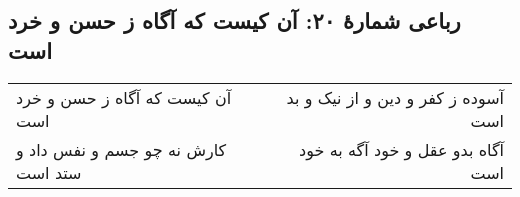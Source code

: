 \begin{center}
\section*{رباعی شمارهٔ ۲۰: آن کیست که آگاه ز حسن و خرد است}
\label{sec:020}
\begin{longtable}{l p{0.5cm} r}
آن کیست که آگاه ز حسن و خرد است
&&
آسوده ز کفر و دین و از نیک و بد است
\\
کارش نه چو جسم و نفس داد و ستد است
&&
آگاه بدو عقل و خود آگه به خود است
\\
\end{longtable}
\end{center}
